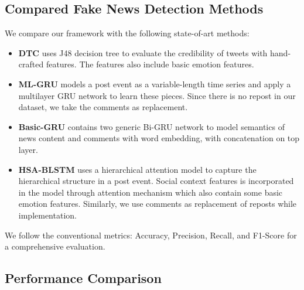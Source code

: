 \documentclass{article}
\newcommand{\m}{EFN}
\begin{document}
	\subsection{Compared Fake News Detection Methods}
	We compare our framework with the following state-of-art methods:
	\begin{itemize}
		\item \textbf{DTC}\cite{castillo2011information} uses J48 decision tree to evaluate the credibility of tweets with hand-crafted features. The features also include basic emotion features. 
		\item \textbf{ML-GRU} \cite{ma2016detecting} models a post event as a variable-length time series and apply a multilayer GRU network to learn these pieces. Since there is no repost in our dataset, we take the comments as replacement.
		\item \textbf{Basic-GRU} contains two generic Bi-GRU network to model semantics of news content and comments with word embedding, with concatenation on top layer.
		\item \textbf{HSA-BLSTM} \cite{guo2018rumor} uses a hierarchical attention model to capture the hierarchical structure in a post event. Social context features is incorporated in the model through attention mechanism which also contain some basic emotion features. Similarly, we use comments as replacement of reposts while implementation.
	\end{itemize} 
	We follow the conventional metrics:  Accuracy, Precision, Recall, and F1-Score for a comprehensive evaluation.
	
	\subsection{Performance Comparison}
	
\end{document}
